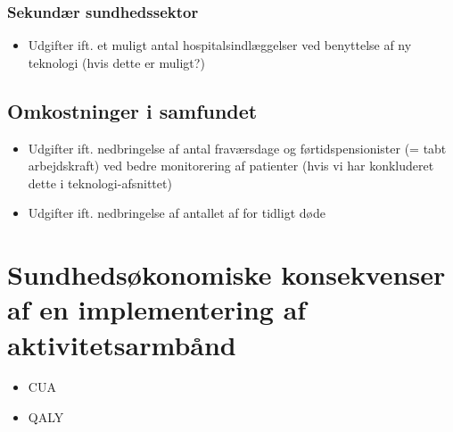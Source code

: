 \subsubsection{Sekundær sundhedssektor}
\begin{itemize}
\item Udgifter ift. et muligt antal hospitalsindlæggelser ved benyttelse af ny teknologi (hvis dette er muligt?)
\end{itemize}
\subsection{Omkostninger i samfundet}
\begin{itemize}
\item Udgifter ift. nedbringelse af antal fraværsdage og førtidspensionister (= tabt arbejdskraft) ved bedre monitorering af patienter (hvis vi har konkluderet dette i teknologi-afsnittet)
\item Udgifter ift. nedbringelse af antallet af for tidligt døde
\end{itemize}

\section{Sundhedsøkonomiske konsekvenser af en implementering af aktivitetsarmbånd}
\begin{itemize}
\item CUA
\item QALY
\end{itemize}
